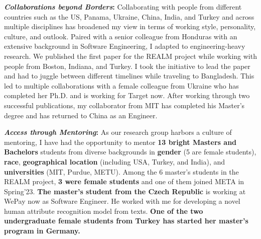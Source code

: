 \documentclass[10pt]{article}
\newcommand*\heading[1]{\textbf{\textit{#1}:}}
\begin{document}
\heading{Collaborations beyond Borders}
Collaborating with people from different countries
such as the US, Panama, Ukraine, China, India, and Turkey
and across multiple disciplines 
has broadened my view in terms of working style, personality, culture, and outlook. 
Paired with a senior colleague from Honduras with an extensive background in Software Engineering, I adapted to engineering-heavy research. We published the first paper for the REALM project while working with people from Boston, Indiana, and Turkey. I took the initiative to lead the paper and had to juggle between different timelines while traveling to Bangladesh.
This led to multiple collaborations with a female colleague from Ukraine who has completed her Ph.D. and is working for Target now. 
After working through two successful publications, my collaborator from MIT has completed his Master's degree and has returned to China as an Engineer.

 \heading{Access through Mentoring}
 As our research group harbors a culture of mentoring, I have had the opportunity to mentor \textbf{13 bright Masters and Bachelors}
 students from diverse backgrounds in \textbf{gender} (5 are female students), \textbf{race}, \textbf{geographical location} (including USA, Turkey, and India), and \textbf{universities} (MIT, Purdue, METU). Among the 6 master's students in the REALM project, \textbf{3 were female students} and one of them joined META in Spring'23.
 \textbf{The master's student from the Czech Republic} is working at WePay now as Software Engineer. He worked with me for developing a novel human attribute recognition model from texts. 
\textbf{One of the two undergraduate female students from Turkey has started her master's program in Germany.}
\end{document}
